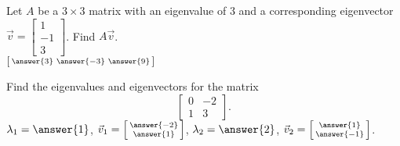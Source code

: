 \documentclass{ximera}
\begin{document}
\begin{exercise}[easy]
    Let $A$ be a $3 \times 3$ matrix with an eigenvalue of 3 and a corresponding eigenvector $\vec{v} = \left[ \begin{smallmatrix} 1 \\ -1 \\ 3 \end{smallmatrix} \right]$. Find $A \vec{v}$.\\
    $\left[\begin{smallmatrix} \answer{3} & \answer{-3} & \answer{9} \end{smallmatrix}\right]$
\end{exercise}

\begin{exercise}%
    Find the eigenvalues and eigenvectors for the matrix
    \[ 
        \begin{bmatrix} 
            0 & -2 \\ 
            1 & 3
        \end{bmatrix}. 
    \]
    $\lambda_1 = \answer{1}$, $\vec{v}_1 = \left[\begin{smallmatrix} \answer{-2} \\ \answer{1}\end{smallmatrix}\right]$, $\lambda_2 = \answer{2}$, $\vec{v}_2 = \left[\begin{smallmatrix} \answer{1} \\ \answer{-1} \end{smallmatrix}\right]$. 
\end{exercise}
\end{document}
